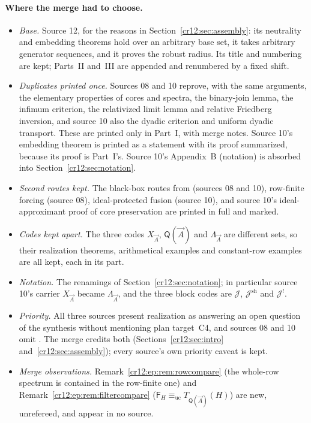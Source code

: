 \documentclass[11pt,letterpaper]{article}
\theoremstyle{plain}
\theoremstyle{definition}
\theoremstyle{remark}
\numberwithin{equation}{section}
\newcommand{\equc}{\equiv_{\mathrm{uc}}}
\newcommand{\Jcode}{\mathcal J}
\newcommand{\Jsh}{\mathcal J^{\mathrm{sh}}} %
\newcommand{\Jfac}{\mathcal J^{!}}       %
\newcommand{\QQ}{\mathsf Q}              %
\newcommand{\Fint}{\mathsf F}            %
\newcommand{\Lam}{\Lambda_{\vec A}}      %
\begin{document}
\paragraph{Where the merge had to choose.}
\begin{itemize}
\item \emph{Base.} Source 12, for the reasons in Section~\ref{cr12:sec:assembly}: its
neutrality and embedding theorems hold over an arbitrary base set, it takes arbitrary
generator sequences, and it proves the robust radius. Its title and numbering are
kept; Parts~II and~III are appended and renumbered by a fixed shift.
\item \emph{Duplicates printed once.} Sources 08 and 10 reprove, with the same
arguments, the elementary properties of cores and spectra, the binary-join lemma, the
infimum criterion, the relativized limit lemma and relative Friedberg inversion, and
source 10 also the dyadic criterion and uniform dyadic transport. These are printed
only in Part~I, with merge notes. Source 10's embedding theorem is printed as a
statement with its proof summarized, because its proof is Part~I's. Source 10's
Appendix~B (notation) is absorbed into Section~\ref{cr12:sec:notation}.
\item \emph{Second routes kept.} The black-box routes from \cite[Theorem~3.7]{HJKS}
(sources 08 and 10), row-finite forcing (source 08), ideal-protected fusion (source
10), and source 10's ideal-approximant proof of core preservation are printed in full
and marked.
\item \emph{Codes kept apart.} The three codes $X_{\vec A}$, $\QQ(\vec A)$ and $\Lam$
are different sets, so their realization theorems, arithmetical examples and
constant-row examples are all kept, each in its part.
\item \emph{Notation.} The renamings of Section~\ref{cr12:sec:notation}; in particular
source 10's carrier $X_{\vec A}$ became $\Lam$, and the three block codes are
$\Jcode$, $\Jsh$ and $\Jfac$.
\item \emph{Priority.} All three sources present realization as answering an open
question of the synthesis without mentioning plan target~C4, and sources 08 and 10
omit \cite{HJS}. The merge credits both (Sections~\ref{cr12:sec:intro}
and~\ref{cr12:sec:assembly}); every source's own priority caveat is kept.
\item \emph{Merge observations.} Remark~\ref{cr12:ep:rem:rowcompare} (the whole-row
spectrum is contained in the row-finite one) and Remark~\ref{cr12:ep:rem:filtercompare}
($\Fint_H\equc T_{\QQ(\vec A)}(H)$) are new, unrefereed, and appear in no source.
\end{itemize}
\end{document}
